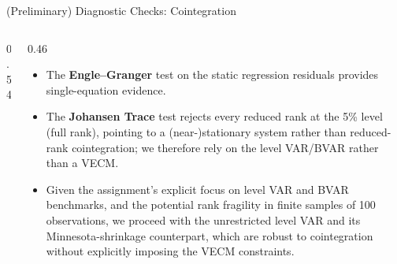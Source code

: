 \documentclass[9pt]{beamer}
\begin{document}
\begin{frame}{(Preliminary) Diagnostic Checks: Cointegration}
\label{slide:cointegration}
\footnotesize

\begin{columns}

  \begin{column}{0.54\textwidth}
    {\fontsize{5.5}{6}\selectfont
    \setlength{\tabcolsep}{2.5pt}
    \setlength{\abovecaptionskip}{2pt}
    \setlength{\belowcaptionskip}{1pt}
    
    \vspace{0.1cm}
    
    \vspace{0.1cm}
    
    }
  \end{column}

  \begin{column}{0.46\textwidth}
    \footnotesize
    \begin{itemize}\setlength{\itemsep}{2pt}\setlength{\parskip}{0pt}
      \item The \textbf{Engle--Granger} test on the static regression residuals provides single-equation evidence. 
      \item The \textbf{Johansen Trace} test rejects every reduced rank at the 5\% level (full rank), pointing to a (near-)stationary system rather than reduced-rank cointegration; we therefore rely on the level VAR/BVAR rather than a VECM.
      \item Given the assignment's explicit focus on level VAR and BVAR benchmarks, and the potential rank fragility in finite samples of 100 observations, we proceed with the unrestricted level VAR and its Minnesota-shrinkage counterpart, which are robust to cointegration without explicitly imposing the VECM constraints.
    \end{itemize}
  \end{column}

\end{columns}

\end{frame}


\end{document}
